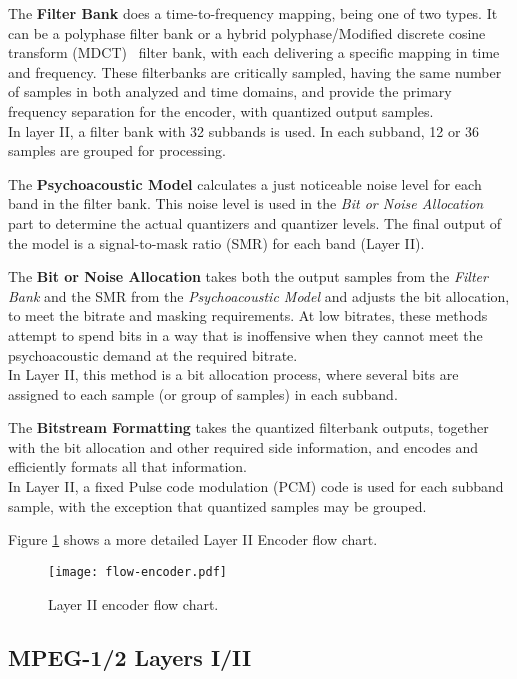 The \textbf{Filter Bank} does a time-to-frequency mapping, being one of two types. It can be a polyphase filter bank or a hybrid polyphase/Modified discrete cosine transform (MDCT)~\cite{mdct} filter bank, with each delivering a specific mapping in time and frequency.
These filterbanks are critically sampled, having the same number of samples in both analyzed and time domains, and provide the primary frequency separation for the encoder, with quantized output samples. \\
In layer II, a filter bank with 32 subbands is used. In each subband, 12 or 36 samples are grouped for processing.

The \textbf{Psychoacoustic Model} calculates a just noticeable noise level for each band in the filter bank. This noise level is used in the \textit{Bit or Noise Allocation} part to determine the actual quantizers and quantizer levels. 
The final output of the model is a signal-to-mask ratio (SMR) for each band (Layer II).

The \textbf{Bit or Noise Allocation} takes both the output samples from the \textit{Filter Bank} and the SMR from the \textit{Psychoacoustic Model} and adjusts the bit allocation, to meet the bitrate and masking requirements. At low bitrates, these methods attempt to spend bits in a way that is inoffensive when they cannot meet the psychoacoustic demand at the required bitrate.\\
In Layer II, this method is a bit allocation process, where several bits are assigned to each sample (or group of samples) in each subband.

The \textbf{Bitstream Formatting} takes the quantized filterbank outputs, together with the bit allocation and other required side information, and encodes and efficiently formats all that information.\\
In Layer II, a fixed Pulse code modulation (PCM) code is used for each subband sample, with the exception that quantized samples may be grouped.

Figure \ref{fig:flow-encoder} shows a more detailed Layer II Encoder flow chart.

\begin{figure}[H]
\centerline{\texttt{[image: flow-encoder.pdf]}}
\caption{Layer II encoder flow chart.}
\label{fig:flow-encoder}
\end{figure}

\subsection{MPEG-1/2 Layers I/II}

